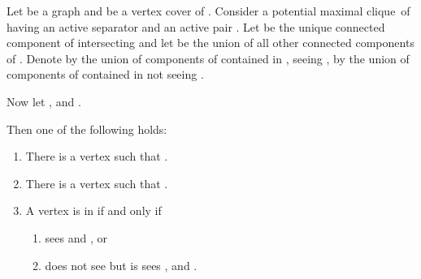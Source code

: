 \documentclass{llncs}
\newcommand{\pmc}{potential maximal clique}
\begin{document}
 \begin{lemma}\label{le:pmc4part}
Let  be a graph and  be a vertex cover of . Consider a \pmc\  of  having an active separator  and an active pair .
Let  be the unique connected component of  intersecting  and let  be the union of all other connected components of . 
Denote by   the union of components of  contained in , seeing , by  the union of components of  contained in  not seeing . 



Now let ,  and .  

Then one of the following holds:
\begin{enumerate}
\item\label{it:1} There is a vertex  such that .
\item There is a vertex  such that .
\item A vertex  is in  if and only if
\begin{enumerate}
\item\label{it:SW}  sees  and , or
\item\label{it:TW}  does not see  but is sees  ,  and .
\end{enumerate}
\end{enumerate}
\end{lemma} 
\end{document}
